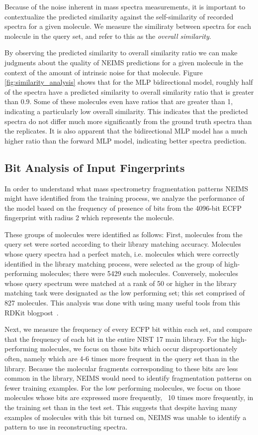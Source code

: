 \documentclass{article}
\begin{document}
Because of the noise inherent in mass spectra measurements, it is important to contextualize the predicted similarity against the self-similarity of recorded spectra for a given molecule. We measure the similiraty between spectra for each molecule in the query set, and refer to this as the \textit{overall similarity}.

By observing the predicted similarity to overall similarity ratio we can make judgments about the quality of NEIMS predictions for a given molecule in the context of the amount of intrinsic noise for that molecule.
Figure \ref{fig:similarity_analysis} shows that for the MLP bidirectional model, roughly half of the spectra have a predicted similarity to overall similarity ratio that is greater than 0.9. Some of these molecules even have ratios that are greater than 1, indicating a particularly low overall similarity. This indicates that the predicted spectra do not differ much more significantly from the ground truth spectra than the replicates.
It is also apparent that the bidirectional MLP model has a much higher ratio than the forward MLP model, indicating better spectra prediction. 

\subsection{Bit Analysis of Input Fingerprints}

In order to understand what mass spectrometry fragmentation patterns NEIMS might have identified from the training process, we analyze the performance of the model based on the frequency of presence of bits from the 4096-bit ECFP fingerprint with radius 2 which represents the molecule.

These groups of molecules were identified as follows: First, molecules from the query set were sorted according to their library matching accuracy. Molecules whose query spectra had a perfect match, i.e. molecules which were correctly identified in the library matching process, were selected as the group of high-performing molecules; there were 5429 such molecules. Conversely, molecules whose query spectrum were matched at a rank of 50 or higher in the library matching task were designated as the low performing set; this set comprised of 827 molecules. This analysis was done with using many useful tools from this RDKit blogpost~\cite{rdkit_blogpost_bit_statistics}.

Next, we measure the frequency of every ECFP bit within each set, and compare that the frequency of each bit in the entire NIST 17 main library. For the high-performing molecules, we focus on those bits which occur disproportionately often, namely which are 4-6 times more frequent in the query set than in the library. Because the molecular fragments corresponding to these bits are less common in the library, NEIMS would need to identify fragmentation patterns on fewer training examples. For the low performing molecules, we focus on those molecules whose bits are expressed more frequently, ~10 times more frequently, in the training set than in the test set. This suggests that despite having many examples of molecules with this bit turned on, NEIMS was unable to identify a pattern to use in reconstructing spectra.
\end{document}
